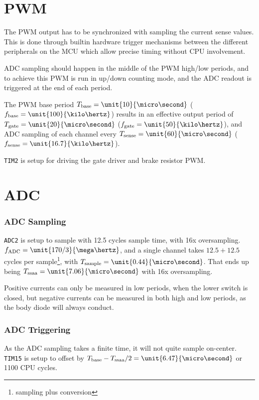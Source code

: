\documentclass[12pt,a4paper,oneside,openany]{article}
\begin{document}
\section{PWM}

The PWM output has to be synchronized with sampling the current sense values. This is done through builtin hardware trigger mechanisms between the different peripherals on the MCU which allow precise timing without CPU involvement.

ADC sampling should happen in the middle of the PWM high/low periods, and to achieve this PWM is run in up/down counting mode, and the ADC readout is triggered at the end of each period.

The PWM base period $T_{\textrm{base}} = \unit{10}{\micro\second}$ ($f_{\textrm{base}} = \unit{100}{\kilo\hertz}$) results in an effective output period of $T_{\textrm{gate}} = \unit{20}{\micro\second}$ ($f_{\textrm{gate}} = \unit{50}{\kilo\hertz}$), and ADC sampling of each channel every $T_{\textrm{sense}} = \unit{60}{\micro\second}$ ($f_{\textrm{sense}} = \unit{16.7}{\kilo\hertz}$).

\texttt{TIM2} is setup for driving the gate driver and brake resistor PWM.

\section {ADC}

\subsubsection{ADC Sampling}

\texttt{ADC2} is setup to sample with 12.5 cycles sample time, with 16x oversampling. $f_{\textrm{ADC}} = \unit{170/3}{\mega\hertz}$, and a single channel takes $12.5+12.5$ cycles per sample\footnote{sampling plus conversion}, with $T_{\textrm{sample}} = \unit{0.44}{\micro\second}$. That ends up being $T_{\textrm{ssaa}} = \unit{7.06}{\micro\second}$ with 16x oversampling.

Positive currents can only be measured in low periods, when the lower switch is closed, but negative currents can be measured in both high and low periods, as the body diode will always conduct.

\subsubsection{ADC Triggering}

As the ADC sampling takes a finite time, it will not quite sample on-center. \texttt{TIM15} is setup to offset by $T_{\textrm{base}} - T_{\textrm{ssaa}}/2 = \unit{6.47}{\micro\second}$ or 1100 CPU cycles.
\end{document}
